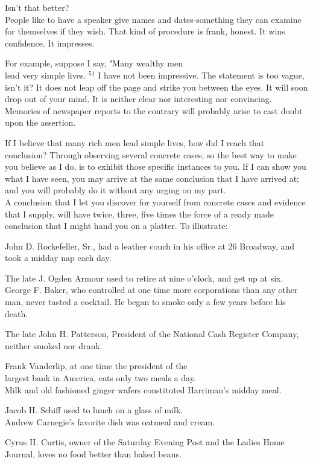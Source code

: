 \documentclass[10pt]{article}
\begin{document}
Isn't that better?\\
People like to have a speaker give names and dates-something they can examine for themselves if they wish. That kind of procedure is frank, honest. It wins confidence. It impresses.

For example, suppose I say, "Many wealthy men\\
lead very simple lives. ${ }^{51}$ I have not been impressive. The statement is too vague, isn't it? It does not leap off the page and strike you between the eyes. It will soon drop out of your mind. It is neither clear nor interesting nor convincing. Memories of newspaper reports to the contrary will probably arise to cast doubt upon the assertion.

If I believe that many rich men lead simple lives, how did I reach that conclusion? Through observing several concrete cases; so the best way to make you believe as I do, is to exhibit those specific instances to you. If I can show you what I have seen, you may arrive at the same conclusion that I have arrived at; and you will probably do it without any urging on my part.\\
A conclusion that I let you discover for yourself from concrete cases and evidence that I supply, will have twice, three, five times the force of a ready made conclusion that I might hand you on a platter. To illustrate:

John D. Rockefeller, Sr., had a leather couch in his office at 26 Broadway, and took a midday nap each day.

The late J. Ogden Armour used to retire at nine o'clock, and get up at six.\\
George F. Baker, who controlled at one time more corporations than any other man, never tasted a cocktail. He began to smoke only a few years before his death.

The late John H. Patterson, President of the National Cash Register Company, neither smoked nor drank.

Frank Vanderlip, at one time the president of the\\
largest bank in America, eats only two meals a day.\\
Milk and old fashioned ginger wafers constituted Harriman's midday meal.

Jacob H. Schiff used to lunch on a glass of milk.\\
Andrew Carnegie's favorite dish was oatmeal and cream.

Cyrus H. Curtis, owner of the Saturday Evening Post and the Ladies Home Journal, loves no food better than baked beans.
\end{document}
